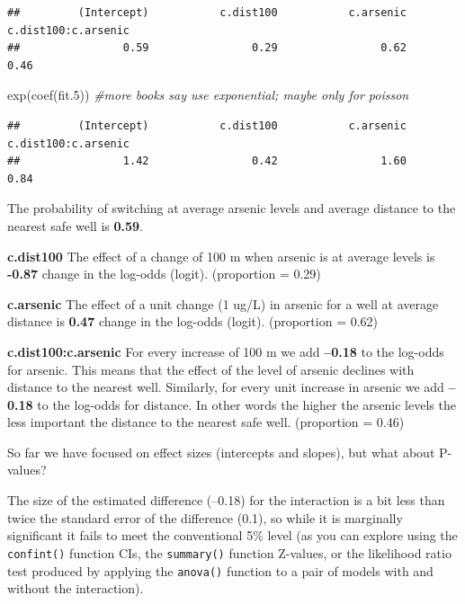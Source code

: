 \documentclass[
]{article}
\newenvironment{Shaded}{\begin{snugshade}}{\end{snugshade}}
\newcommand{\CommentTok}[1]{\textcolor[rgb]{0.56,0.35,0.01}{\textit{#1}}}
\newcommand{\FloatTok}[1]{\textcolor[rgb]{0.00,0.00,0.81}{#1}}
\newcommand{\FunctionTok}[1]{\textcolor[rgb]{0.00,0.00,0.00}{#1}}
\newcommand{\NormalTok}[1]{#1}
\begin{document}
\begin{verbatim}
##         (Intercept)           c.dist100           c.arsenic c.dist100:c.arsenic 
##                0.59                0.29                0.62                0.46
\end{verbatim}

\begin{Shaded}
\begin{Highlighting}[]
\FunctionTok{exp}\NormalTok{(}\FunctionTok{coef}\NormalTok{(fit}\FloatTok{.5}\NormalTok{)) }\CommentTok{\#more books say use exponential; maybe only for poisson}
\end{Highlighting}
\end{Shaded}

\begin{verbatim}
##         (Intercept)           c.dist100           c.arsenic c.dist100:c.arsenic 
##                1.42                0.42                1.60                0.84
\end{verbatim}

The probability of switching at average arsenic levels and average
distance to the nearest safe well is \textbf{0.59}.

\textbf{c.dist100} The effect of a change of 100 m when arsenic is at
average levels is \textbf{-0.87} change in the log-odds (logit).
(proportion = 0.29)

\textbf{c.arsenic} The effect of a unit change (1 ug/L) in arsenic for a
well at average distance is \textbf{0.47} change in the log-odds
(logit). (proportion = 0.62)

\textbf{c.dist100:c.arsenic} For every increase of 100 m we add
\textbf{--0.18} to the log-odds for arsenic. This means that the effect
of the level of arsenic declines with distance to the nearest well.
Similarly, for every unit increase in arsenic we add \textbf{--0.18} to
the log-odds for distance. In other words the higher the arsenic levels
the less important the distance to the nearest safe well. (proportion =
0.46)

So far we have focused on effect sizes (intercepts and slopes), but what
about P-values?

The size of the estimated difference (--0.18) for the interaction is a
bit less than twice the standard error of the difference (0.1), so while
it is marginally significant it fails to meet the conventional 5\% level
(as you can explore using the \texttt{confint()} function CIs, the
\texttt{summary()} function Z-values, or the likelihood ratio test
produced by applying the \texttt{anova()} function to a pair of models
with and without the interaction).
\end{document}
